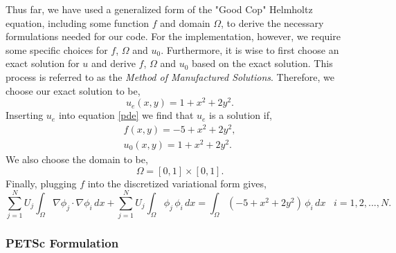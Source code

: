 \documentclass[]{article}
\theoremstyle{definition}
\begin{document}
Thus far, we have used a generalized form of the "Good Cop" Helmholtz equation, including some function $f$ and domain $\Omega$, to derive the necessary formulations needed for our code.  For the implementation, however, we require some specific choices for $f$, $\Omega$ and $u_0$.  Furthermore, it is wise to first choose an exact solution for $u$ and   derive $f$, $\Omega$ and $u_0$ based on the exact solution.  This process is referred to as the \textit{Method of Manufactured Solutions}.  Therefore, we choose our exact solution to be,
\begin{equation}
u_e(x,y) = 1 + x^2 + 2 y^2.
\end{equation}
Inserting $u_e$ into equation \eqref{pde} we find that $u_e$ is a solution if,
\begin{align}
f(x,y) = -5 + x^2 + 2 y^2, \\
u_0(x,y) = 1 + x^2 + 2 y^2.
\end{align}
We also choose the domain to be,
\begin{equation}
\Omega = [0,1] \times [0,1].
\end{equation}
Finally, plugging $f$ into the discretized variational form gives,
\begin{equation}
\sum^N_{j=1} U_j \int_{\Omega} \nabla \phi_j \cdot \nabla \phi_i \, dx + \sum^N_{j=1} U_j \int_{\Omega} \phi_j \, \phi_i \, dx = \int_{\Omega} (-5 + x^2 + 2 y^2) \, \phi_i \, dx \;\;\; i = 1,2,...,N.
\end{equation}



\subsubsection{PETSc Formulation}
\end{document}
